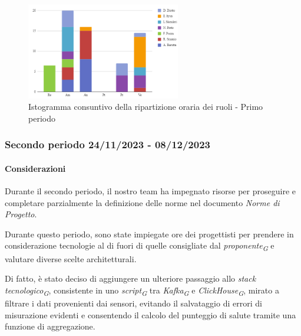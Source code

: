 \vspace{0.6cm}

\begin{figure}[H]
    \centering
    \includegraphics[width=0.6\textwidth]{../Images/consuntivoDivisioneRuoli1Periodo.png}
    \caption{Istogramma consuntivo della ripartizione oraria dei ruoli - Primo periodo}
    \label{fig:Consuntivo_ripartizione_oraria_1}
\end{figure}


\subsubsection{Secondo periodo  24/11/2023 - 08/12/2023}
\paragraph{Considerazioni}

Durante il secondo periodo, il nostro team ha impegnato risorse per proseguire e completare parzialmente la definizione delle norme nel documento \textit{Norme di Progetto}.

Durante questo periodo, sono state impiegate ore dei progettisti per prendere in considerazione tecnologie al di fuori di quelle consigliate dal \textit{proponente}\textsubscript{\textit{G}} e valutare diverse scelte architetturali.

Di fatto, è stato deciso di aggiungere un ulteriore passaggio allo \textit{stack tecnologico}\textsubscript{\textit{G}}, consistente in uno \textit{script}\textsubscript{\textit{G}} tra \textit{Kafka}\textsubscript{\textit{G}} e \textit{ClickHouse}\textsubscript{\textit{G}}, mirato a filtrare i dati provenienti dai sensori, evitando il salvataggio di errori di misurazione evidenti e consentendo il calcolo del punteggio di salute tramite una funzione di aggregazione.

\vspace{0.2cm}

